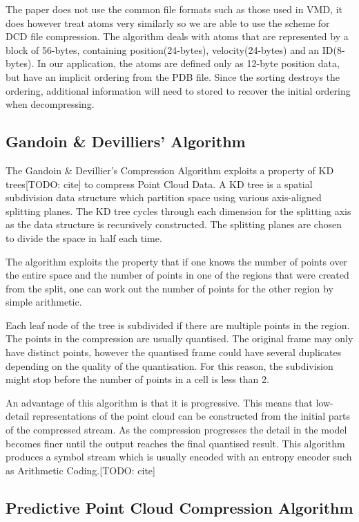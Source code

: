 \documentclass[a4paper,11pt]{report}
\begin{document}
The paper does not use the common file formats such as those used in VMD, it does however treat atoms very similarly so we are able to use the scheme for DCD file compression. The algorithm deals with atoms that are represented by a block of 56-bytes, containing position(24-bytes), velocity(24-bytes) and an ID(8-bytes). In our application, the atoms are defined only as 12-byte position data, but have an implicit ordering from the PDB file. Since the sorting destroys the ordering, additional information will need to stored to recover the initial ordering when decompressing.

\subsection{Gandoin \& Devilliers' Algorithm}

The Gandoin \& Devillier's Compression Algorithm exploits a property of KD trees[TODO: cite] to compress Point Cloud Data.\cite{devillers2000gci} A KD tree is a spatial subdivision data structure which partition space using various axis-aligned splitting planes. The KD tree cycles through each dimension for the splitting axis as the data structure is recursively constructed. The splitting planes are chosen to divide the space in half each time.

The algorithm exploits the property that if one knows the number of points over the entire space and the number of points in one of the regions that were created from the split, one can work out the number of points for the other region by simple arithmetic.

Each leaf node of the tree is subdivided if there are multiple points in the region. The points in the compression are usually quantised. The original frame may only have distinct points, however the quantised frame could have several duplicates depending on the quality of the quantisation. For this reason, the subdivision might stop before the number of points in a cell is less than 2.

An advantage of this algorithm is that it is progressive. This means that low-detail representations of the point cloud can be constructed from the initial parts of the compressed stream. As the compression progresses the detail in the model becomes finer until the output reaches the final quantised result. This algorithm produces a symbol stream which is usually encoded with an entropy encoder such as Arithmetic Coding.[TODO: cite]

\subsection{Predictive Point Cloud Compression Algorithm}
\end{document}
